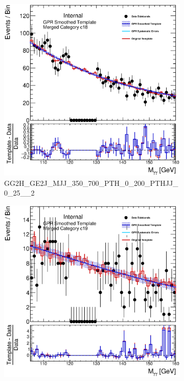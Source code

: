 \begin{figure}
\begin{center}
\begin{subfigure}[T]{0.49\linewidth}
	\centering
	\includegraphics[width=\linewidth]{figures/background/gpr/coupCatTemplates/GPR_Smoothed_Plot_hmgg_c18.eps}
	\caption{\tiny{GG2H\_GE2J\_MJJ\_350\_700\_PTH\_0\_200\_PTHJJ\_0\_25\_\_2}}
\end{subfigure}
\begin{subfigure}[T]{0.49\linewidth}
	\centering
	\includegraphics[width=\linewidth]{figures/background/gpr/coupCatTemplates/GPR_Smoothed_Plot_hmgg_c19.eps}

\end{subfigure}
\end{center}
\end{figure}
